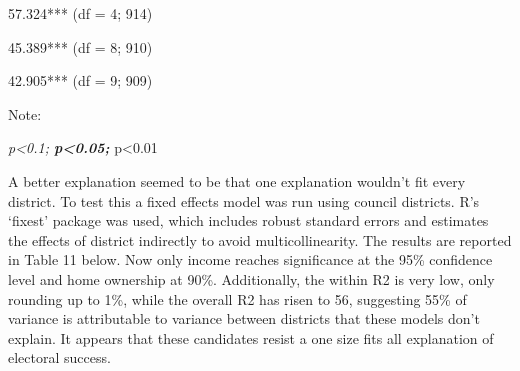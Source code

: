 \documentclass[
  letterpaper,
  DIV=11,
  numbers=noendperiod]{scrartcl}
\begin{document}
57.324*** (df = 4; 914)

45.389*** (df = 8; 910)

42.905*** (df = 9; 909)

Note:

\emph{p\textless0.1; \textbf{p\textless0.05; }}p\textless0.01

A better explanation seemed to be that one explanation wouldn't fit
every district. To test this a fixed effects model was run using council
districts. R's `fixest' package was used, which includes robust standard
errors and estimates the effects of district indirectly to avoid
multicollinearity. The results are reported in Table 11 below. Now only
income reaches significance at the 95\% confidence level and home
ownership at 90\%. Additionally, the within R2 is very low, only
rounding up to 1\%, while the overall R2 has risen to 56, suggesting
55\% of variance is attributable to variance between districts that
these models don't explain. It appears that these candidates resist a
one size fits all explanation of electoral success.
\end{document}
